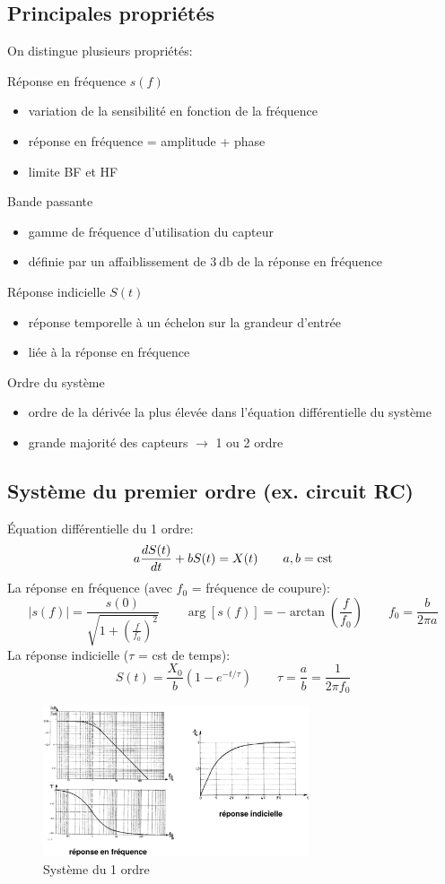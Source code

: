 \subsection{Principales propriétés}
On distingue plusieurs propriétés:
\begin{description}
	\item Réponse en fréquence \(s(f)\)
	\begin{itemize}
		\item variation de la sensibilité en fonction de la fréquence
		\item réponse en fréquence = amplitude + phase
		\item limite BF et HF
	\end{itemize}
	\item Bande passante
	\begin{itemize}
		\item gamme de fréquence d'utilisation du capteur
		\item définie par un affaiblissement de \(\SI{3}{\decibel}\) de la réponse en fréquence
	\end{itemize}
	\item Réponse indicielle \(S(t)\)
	\begin{itemize}
		\item réponse temporelle à un échelon sur la grandeur d'entrée
		\item liée à la réponse en fréquence
	\end{itemize}
	\item Ordre du système
	\begin{itemize}
		\item ordre de la dérivée la plus élevée dans l'équation différentielle du système
		\item grande majorité des capteurs \(\rightarrow\) 1 ou 2 ordre
	\end{itemize}
\end{description}
\subsection{Système du premier ordre (ex. circuit RC)}
Équation différentielle du 1 ordre:
\[
a\frac{d S(t)}{dt} + b S(t) = X(t)\qquad a, b=\text{cst}
\]
La réponse en fréquence (avec \(f_0\) = fréquence de coupure):
\[
|s(f)|=\frac{s(0)}{\sqrt{1+\left(\frac{f}{f_0}\right)^2}}\qquad \arg[s(f)] = -\arctan\left(\frac{f}{f_0}\right)\qquad f_0=\frac{b}{2\pi a}
\]
La réponse indicielle (\(\tau\) = cst de temps):
\[
S(t) = \frac{X_0}{b}\left(1-e^{-t/\tau}\right)\qquad \tau =\frac{a}{b}=\frac{1}{2\pi f_0}
\]
\begin{figure}[H] 
	\centering 
	\includegraphics[width=0.7\textwidth]{ch2/image10} 
	\caption{Système du 1 ordre} 
\end{figure}
